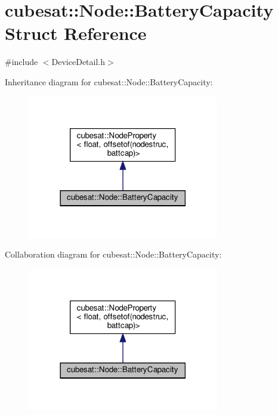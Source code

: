 \hypertarget{structcubesat_1_1Node_1_1BatteryCapacity}{}\section{cubesat\+:\+:Node\+:\+:Battery\+Capacity Struct Reference}
\label{structcubesat_1_1Node_1_1BatteryCapacity}


{\ttfamily \#include $<$Device\+Detail.\+h$>$}



Inheritance diagram for cubesat\+:\+:Node\+:\+:Battery\+Capacity\+:
\nopagebreak
\begin{figure}[H]
\begin{center}
\leavevmode
\includegraphics[width=237pt]{structcubesat_1_1Node_1_1BatteryCapacity__inherit__graph}
\end{center}
\end{figure}


Collaboration diagram for cubesat\+:\+:Node\+:\+:Battery\+Capacity\+:
\nopagebreak
\begin{figure}[H]
\begin{center}
\leavevmode
\includegraphics[width=237pt]{structcubesat_1_1Node_1_1BatteryCapacity__coll__graph}
\end{center}
\end{figure}
